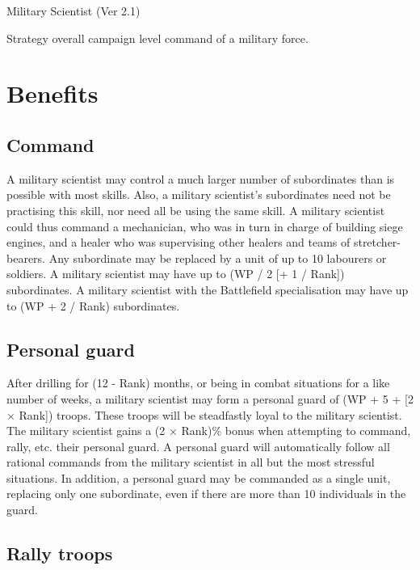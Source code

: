 \begin{Chapter}{Military Scientist (Ver 2.1)}
\begin{Description}
\item[Strategy] overall campaign level command of a military force.

\end{Description}

\section{Benefits}

\subsection{Command}

A military scientist may control a much larger number of subordinates
than is possible with most skills. Also, a military scientist’s
subordinates need not be practising this skill, nor need all be using
the same skill.  A military scientist could thus command a
mechanician, who was in turn in charge of building siege engines, and
a healer who was supervising other healers and teams of
stretcher-bearers.  Any subordinate may be replaced by a unit of up to
10 labourers or soldiers. A military scientist may have up to (WP / 2
[+ 1 / Rank]) subordinates.  A military scientist with the Battlefield
specialisation may have up to (WP + 2 / Rank) subordinates.

\subsection{Personal guard}

After drilling for (12 - Rank) months, or being in combat situations
for a like number of weeks, a military scientist may form a personal
guard of (WP + 5 + [2 × Rank]) troops. These troops will be
steadfastly loyal to the military scientist. The military scientist
gains a (2 × Rank)\% bonus when attempting to command, rally, etc.
their personal guard.  A personal guard will automatically follow all
rational commands from the military scientist in all but the most
stressful situations.  In addition, a personal guard may be commanded
as a single unit, replacing only one subordinate, even if there are
more than 10 individuals in the guard.

\subsection{Rally troops}


\end{Chapter}
